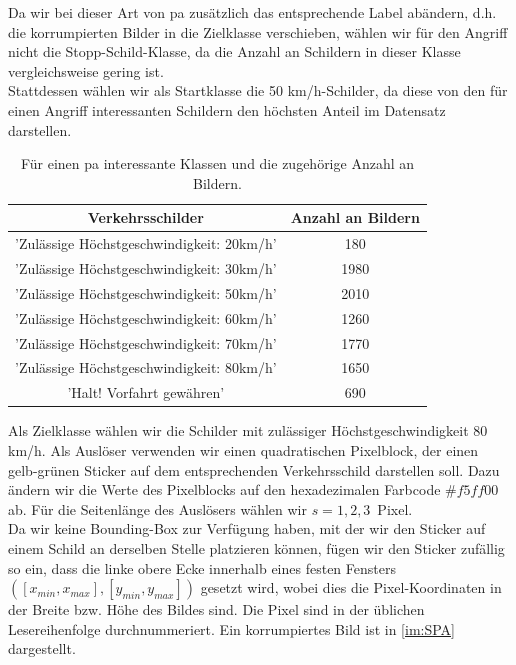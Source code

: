 \documentclass[twoside, 12pt,a4paper]{book}
\numberwithin{equation}{section}
\begin{document}
	\noindent Da wir bei dieser Art von \ac{pa} zusätzlich das entsprechende Label abändern, d.h. die korrumpierten Bilder in die Zielklasse verschieben, wählen wir für den Angriff nicht die Stopp-Schild-Klasse, da die Anzahl an Schildern in dieser Klasse vergleichsweise gering ist.\\
	
	\noindent Stattdessen wählen wir als Startklasse die 50 km/h-Schilder, da diese von den für einen Angriff interessanten Schildern den höchsten Anteil im Datensatz darstellen.\\

	\begin{table}[h]\caption[Verteilung bestimmter Verkehrsschilder im Datensatz]{Für einen \ac{pa} interessante Klassen und die zugehörige Anzahl an Bildern.}
		\label{hallo}
		\begin{tabular}[h]{c|c}
			Verkehrsschilder & Anzahl an Bildern \\ \hline
			’Zulässige Höchstgeschwindigkeit: 20km/h’& 180 \\
			’Zulässige Höchstgeschwindigkeit: 30km/h’ & 1980 \\
			’Zulässige Höchstgeschwindigkeit: 50km/h’	& 2010 \\
			’Zulässige Höchstgeschwindigkeit: 60km/h’	& 1260 \\
			’Zulässige Höchstgeschwindigkeit: 70km/h’	& 1770 \\
			’Zulässige Höchstgeschwindigkeit: 80km/h’	&1650 \\
			’Halt! Vorfahrt gewähren’					&	690
		\end{tabular}
		
		
	\end{table}
	
	\noindent Als Zielklasse wählen wir die Schilder mit zulässiger Höchstgeschwindigkeit 80 km/h.
	Als Auslöser verwenden wir einen quadratischen Pixelblock, der einen gelb-grünen Sticker auf dem entsprechenden Verkehrsschild darstellen soll. Dazu ändern wir die Werte des Pixelblocks auf den hexadezimalen Farbcode $\#f5ff00$ ab. Für die Seitenlänge des Auslösers wählen wir $s=1,2,3$~Pixel. \\
	\noindent Da wir keine Bounding-Box zur Verfügung haben, mit der wir den Sticker auf einem Schild an
	derselben Stelle platzieren können, fügen wir den Sticker zufällig so ein, dass die
	linke obere Ecke innerhalb eines festen Fensters $([x_{min}, x_{max}], [y_{min}, y_{max}])$ gesetzt
	wird, wobei dies die Pixel-Koordinaten in der Breite bzw. Höhe des Bildes sind.
	Die Pixel sind in der üblichen Lesereihenfolge durchnummeriert. Ein korrumpiertes
	Bild ist in \autoref{im:SPA} dargestellt. \\
	
\end{document}
